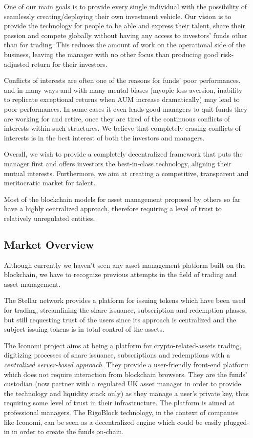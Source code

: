 \documentclass[9pt,oneside]{amsart}
\begin{document}
\begin{multicols}{2}
One of our main goals is to provide every single individual with the possibility of seamlessly creating/deploying their own investment vehicle. Our vision is to provide the technology for people to be able and express their talent, share their passion and compete globally without having any access to investors' funds other than for trading. This reduces the amount of work on the operational side of the business, leaving the manager with no other focus than producing good risk-adjusted return for their investors.

Conflicts of interests are often one of the reasons for funds' poor performances, and in many ways and with many mental biases (myopic loss aversion, inability to replicate exceptional returns when AUM increase dramatically) may lead to poor performances. In some cases it even leads good managers to quit funds they are working for and retire, once they are tired of the continuous conflicts of interests within such structures. We believe that completely erasing conflicts of interests is in the best interest of both the investors and managers.

Overall, we wish to provide a completely decentralized framework that puts the manager first and offers investors the best-in-class technology, aligning their mutual interests. Furthermore, we aim at creating a competitive, transparent and meritocratic market for talent.

Most of the blockchain models for asset management proposed by others so far have a highly centralized approach, therefore requiring a level of trust to relatively unregulated entities.

\subsection{Market Overview} \label{ch:previous}

Although currently we haven't seen any asset management platform built on the blockchain, we have to recognize previous attempts in the field of trading and asset management.

The Stellar network provides a platform for issuing tokens which have been used for trading, streamlining the share issuance, subscription and redemption phases, but still requesting trust of the users since its approach is centralized and the subject issuing tokens is in total control of the assets.

The Iconomi project aims at being a platform for crypto-related-assets trading, digitizing processes of share issuance, subscriptions and redemptions with a \textit{centralized server-based approach}. They provide a user-friendly front-end platform which does not require interaction from blockchain browsers. They are the funds' custodian (now partner with a regulated UK asset manager in order to provide the technology and liquidity stack only) as they manage a user’s private key, thus requiring some level of trust in their infrastructure. The platform is aimed at professional managers. The RigoBlock technology, in the context of companies like Iconomi, can be seen as a decentralized engine which could be easily plugged-in in order to create the funds on-chain.


\end{multicols}
\end{document}
